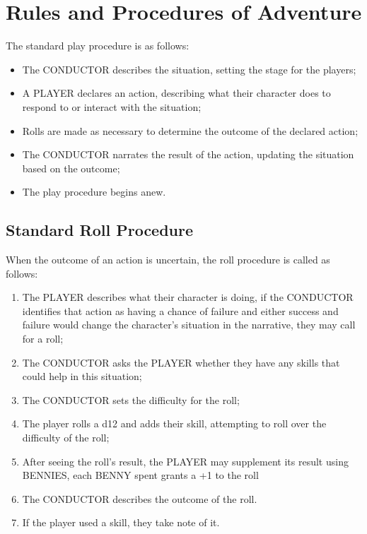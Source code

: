 \section{Rules and Procedures of Adventure}
The standard play procedure is as follows:
\begin{itemize}
    \item The CONDUCTOR describes the situation, setting the stage for the players;
    \item A PLAYER declares an action, describing what their character does to respond to or interact with the situation;
    \item Rolls are made as necessary to determine the outcome of the declared action;
    \item The CONDUCTOR narrates the result of the action, updating the situation based on the outcome;
    \item The play procedure begins anew.
\end{itemize}

\subsection{Standard Roll Procedure}
When the outcome of an action is uncertain, the roll procedure is called as follows:
\begin{enumerate}
    \item {The PLAYER describes what their character is doing, if the CONDUCTOR identifies that action as having a chance of failure and either success and failure would change the character's situation in the narrative, they may call for a roll;}
    \item {The CONDUCTOR asks the PLAYER whether they have any skills that could help in this situation;}
    \item {The CONDUCTOR sets the difficulty for the roll;}
    \item {The player rolls a d12 and adds their skill, attempting to roll over the difficulty of the roll;}
    \item {After seeing the roll's result, the PLAYER may supplement its result using BENNIES, each BENNY spent grants a +1 to the roll}
    \item {The CONDUCTOR describes the outcome of the roll.}
    \item {If the player used a skill, they take note of it.}
\end{enumerate}

